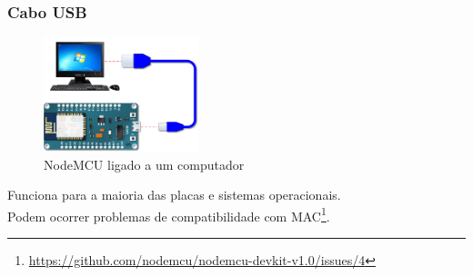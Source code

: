 \documentclass{beamer}
\begin{document}
\begin{frame}
\frametitle{Cabo USB}
\begin{minipage}{\textwidth}
	\begin{figure}[!ht]
		\centering
		\includegraphics[width=0.4\textwidth]{Connect-to-Computer.png}
		\caption{NodeMCU ligado a um computador}
		\label{fig:alimentacao_usb}
	\end{figure}
\end{minipage}

Funciona para a maioria das placas e sistemas operacionais. \\
Podem ocorrer problemas de compatibilidade com MAC\footnote{\url{https://github.com/nodemcu/nodemcu-devkit-v1.0/issues/4}}.

\end{frame} 
\end{document}

